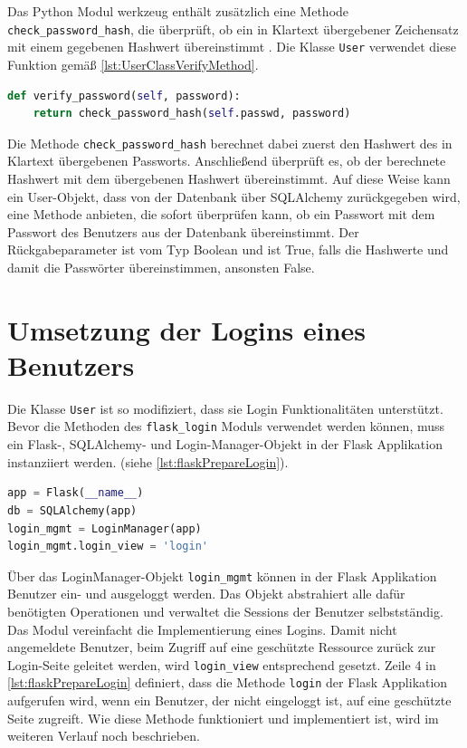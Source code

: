 \documentclass[a4paper,titlepage,halfparskip,12pt]{scrreprt}
\begin{document}
\begin{onehalfspacing}
Das Python Modul werkzeug enthält zusätzlich eine Methode \texttt{check\_password\_hash}, die überprüft, ob ein in Klartext übergebener Zeichensatz mit einem gegebenen Hashwert übereinstimmt \cite{werkzeugDoc}. Die Klasse \texttt{User} verwendet diese Funktion gemäß \autoref{lst:UserClassVerifyMethod}.

\bigskip

\begin{lstlisting}[language=python, caption={Methode zur Überprüfung auf Übereinstimmung eines Zeichensatzes mit einem übergebenen Hashwert}, label={lst:UserClassVerifyMethod}]
def verify_password(self, password):
    return check_password_hash(self.passwd, password)
\end{lstlisting}

Die Methode \texttt{check\_password\_hash} berechnet dabei zuerst den Hashwert des in Klartext übergebenen Passworts. Anschließend überprüft es, ob der berechnete Hashwert mit dem übergebenen Hashwert übereinstimmt. Auf diese Weise kann ein User-Objekt, dass von der Datenbank über SQLAlchemy zurückgegeben wird, eine Methode anbieten, die sofort überprüfen kann, ob ein Passwort mit dem Passwort des Benutzers aus der Datenbank übereinstimmt. Der Rückgabeparameter ist vom Typ Boolean und ist True, falls die Hashwerte und damit die Passwörter übereinstimmen, ansonsten False.

\section{Umsetzung der Logins eines Benutzers}

Die Klasse \texttt{User} ist so modifiziert, dass sie Login Funktionalitäten unterstützt. Bevor die Methoden des \texttt{flask\_login} Moduls verwendet werden können, muss ein Flask-, SQLAlchemy- und Login-Manager-Objekt in der Flask Applikation instanziiert werden. (siehe \autoref{lst:flaskPrepareLogin}).

\begin{lstlisting}[language=python, caption={Vorbereitungen der Login Funktionalität in der Flask Applikation}, label={lst:flaskPrepareLogin}]
app = Flask(__name__)
db = SQLAlchemy(app)
login_mgmt = LoginManager(app)
login_mgmt.login_view = 'login'
\end{lstlisting}

Über das LoginManager-Objekt \texttt{login\_mgmt} können in der Flask Applikation Benutzer ein- und ausgeloggt werden. Das Objekt abstrahiert alle dafür benötigten Operationen und verwaltet die Sessions der Benutzer selbstständig. Das Modul vereinfacht die Implementierung eines Logins. Damit nicht angemeldete Benutzer, beim Zugriff auf eine geschützte Ressource zurück zur Login-Seite geleitet werden, wird \texttt{login\_view} entsprechend gesetzt. Zeile 4 in \autoref{lst:flaskPrepareLogin} definiert, dass die Methode \texttt{login} der Flask Applikation aufgerufen wird, wenn ein Benutzer, der nicht eingeloggt ist, auf eine geschützte Seite zugreift. Wie diese Methode funktioniert und implementiert ist, wird im weiteren Verlauf noch beschrieben.\cite{flaskLogin}


\end{onehalfspacing}
\end{document}
